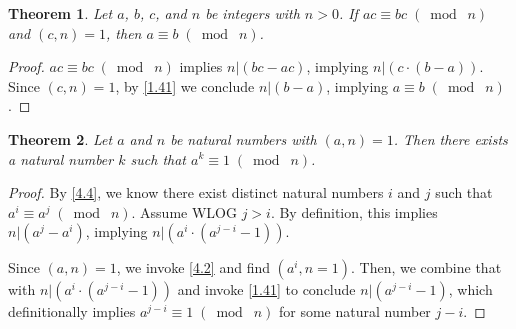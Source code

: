 \documentclass{article}
\newtheorem{thm}{Theorem}[section]
\numberwithin{equation}{thm}
\providecommand{\gmod}[1]{\; (\bmod \; #1)}
\begin{document}
\begin{thm} \label{4.5}
  Let $a$, $b$, $c$, and $n$ be integers with $n > 0$. If $ac \equiv bc \gmod n$ and $(c, n) = 1$, then $a \equiv b \gmod n$.
\end{thm}

\begin{proof}
  $ac \equiv bc \gmod n$ implies $n | (bc - ac)$, implying $n | (c \cdot (b-a))$. Since $(c, n) = 1$, by \ref{1.41} we conclude $n | (b-a)$, implying $a \equiv b \gmod n$.
\end{proof}



\begin{thm} \label{4.6}
  Let $a$ and $n$ be natural numbers with $(a, n) = 1$. Then there exists a natural number $k$ such that $a^k \equiv 1 \gmod n$.
\end{thm}

\begin{proof}
  By \ref{4.4}, we know there exist distinct natural numbers $i$ and $j$ such that $a^i \equiv a^j \gmod n$. Assume WLOG $j > i$. By definition, this implies $n | (a^j - a^i)$, implying $n | (a^i \cdot (a^{j-i} - 1))$.

  Since $(a, n) = 1$, we invoke \ref{4.2} and find $(a^i, n = 1)$. Then, we combine that with $n | (a^i \cdot (a^{j-i} - 1))$ and invoke \ref{1.41} to conclude $n | (a^{j-i} - 1)$, which definitionally implies $a^{j-i} \equiv 1 \gmod n$ for some natural number $j-i$.
\end{proof}
\end{document}

